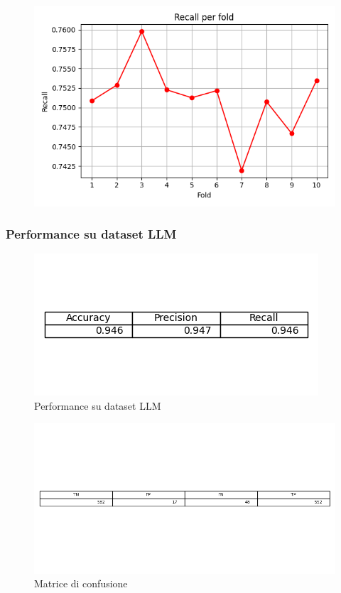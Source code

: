 \documentclass[12pt,a4paper]{report} %
\begin{document}
\begin{figure}[H]
    \centering
    \includegraphics[width=0.75\linewidth]{immagini_modeling/recall_lr.png}
    \label{fig:enter-label}
\end{figure}
\subsubsection{Performance su dataset LLM}
\begin{figure}[H]
    \centering
    \includegraphics[width=0.75\linewidth]{immagini_modeling/lr_performance.png}
    \caption{Performance su dataset LLM}
    \label{fig:enter-label}
\end{figure}
\begin{figure}[H]
    \centering
    \includegraphics[width=1\linewidth]{immagini_modeling/matrice_lr.png}
    \caption{Matrice di confusione}
    \label{fig:enter-label}
\end{figure}
\end{document}
